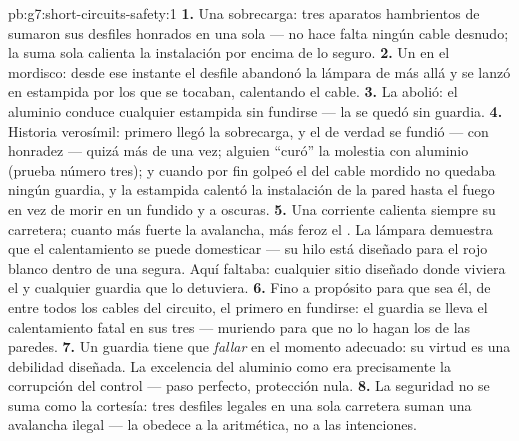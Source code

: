 \begin{solution}{pb:g7:short-circuits-safety:1}
\textbf{1.} Una sobrecarga: tres aparatos hambrientos de  sumaron
sus desfiles honrados en una sola  --- no hace falta ningún
cable desnudo; la suma sola calienta la instalación por encima de lo
seguro.
\textbf{2.} Un  en el mordisco: desde ese instante el
desfile abandonó la lámpara de más allá y se lanzó en estampida por
los  que se tocaban, calentando el cable.
\textbf{3.} La abolió: el aluminio conduce cualquier estampida sin
fundirse --- la  se quedó sin guardia.
\textbf{4.} Historia verosímil: primero llegó la sobrecarga, y el
 de verdad se fundió --- con honradez --- quizá más de una
vez; alguien ``curó'' la molestia con aluminio (prueba número tres); y
cuando por fin golpeó el  del cable mordido no quedaba
ningún guardia, y la estampida calentó la instalación de la pared
hasta el fuego en vez de morir en un  fundido y a oscuras.
\textbf{5.} Una corriente calienta siempre su carretera; cuanto más
fuerte la avalancha, más feroz el . La lámpara demuestra que el
calentamiento se puede domesticar --- su hilo está diseñado para el
rojo blanco dentro de una  segura. Aquí faltaba: cualquier
sitio diseñado donde viviera el  y cualquier guardia que lo
detuviera.
\textbf{6.} Fino a propósito para que sea él, de entre todos los
cables del circuito, el primero en fundirse: el guardia se lleva el
calentamiento fatal en sus tres  --- muriendo para que
no lo hagan los  de las paredes.
\textbf{7.} Un guardia tiene que \emph{fallar} en el momento
adecuado: su virtud es una debilidad diseñada. La excelencia del
aluminio como  era precisamente la corrupción del control
--- paso perfecto, protección nula.
\textbf{8.} La seguridad no se suma como la cortesía: tres desfiles
legales en una sola carretera suman una avalancha ilegal --- la
 obedece a la aritmética, no a las intenciones.

\end{solution}
